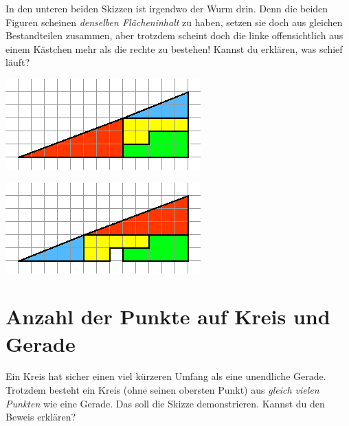 \documentclass[a5paper,ngerman,landscape,11pt]{scrartcl}
\begin{document}
In den unteren beiden Skizzen ist irgendwo der Wurm drin. Denn die beiden
Figuren scheinen \emph{denselben Flächeninhalt} zu haben, setzen sie doch aus
gleichen Bestandteilen zusammen, aber trotzdem scheint doch die linke
offensichtlich aus einem Kästchen mehr als die rechte zu bestehen!
Kannst du erklären, was schief läuft?

\begin{raggedright}
\phantom{foobarfrobnicate}
\includegraphics[scale=0.75]{ein-kaestchen-verschwindet-1}
\end{raggedright}

\hfill
\includegraphics[scale=0.75]{ein-kaestchen-verschwindet-2}


\newpage
\section*{Anzahl der Punkte auf Kreis und Gerade}
Ein Kreis hat sicher einen viel kürzeren Umfang als eine unendliche Gerade.
Trotzdem besteht ein Kreis (ohne seinen obersten Punkt) aus \emph{gleich vielen
Punkten} wie eine Gerade. Das soll die Skizze demonstrieren. Kannst du den
Beweis erklären?
\begin{center}

\end{center}


\vfill
\end{document}
